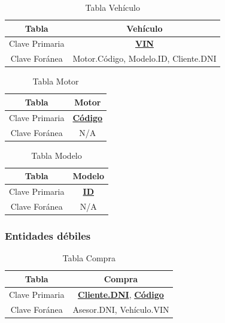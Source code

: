 \documentclass[12pt]{article}
\begin{document}
\begin{table}[htbp]
\begin{center}
\begin{tabular}{|c|c|}
\hline
Tabla & Vehículo \\
\hline
Clave Primaria & \textbf{\underline{VIN}} \\
\hline
Clave Foránea & Motor.Código, Modelo.ID, Cliente.DNI \\
\hline
\end{tabular}
\caption{Tabla Vehículo}
\label{tab:tablas}
\end{center}
\end{table}


\begin{table}[htbp]
\begin{center}
\begin{tabular}{|c|c|}
\hline
Tabla & Motor \\
\hline
Clave Primaria & \textbf{\underline{Código}} \\
\hline
Clave Foránea & N/A \\
\hline
\end{tabular}
\caption{Tabla Motor}
\label{tab:tablas}
\end{center}
\end{table}


\begin{table}[htbp]
\begin{center}
\begin{tabular}{|c|c|}
\hline
Tabla & Modelo \\
\hline
Clave Primaria & \textbf{\underline{ID}} \\
\hline
Clave Foránea & N/A \\
\hline
\end{tabular}
\caption{Tabla Modelo}
\label{tab:tablas}
\end{center}
\end{table}


\subsubsection{Entidades d\'ebiles}

\begin{table}[htbp]
\begin{center}
\begin{tabular}{|c|c|}
\hline
Tabla & Compra \\
\hline
Clave Primaria & \textbf{\underline{Cliente.DNI}}, \textbf{\underline{Código}} \\
\hline
Clave Foránea & Asesor.DNI, Vehículo.VIN \\
\hline
\end{tabular}
\caption{Tabla Compra}
\label{tab:tablas}
\end{center}
\end{table}
\end{document}
